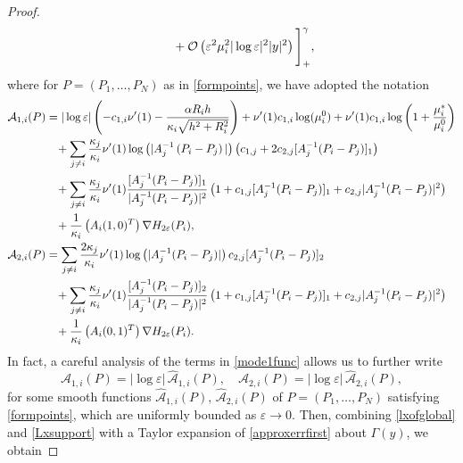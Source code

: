 \documentclass[11pt,reqno,a4paper]{amsart}
\numberwithin{equation}{section}
\newcommand{\ve}{\varepsilon}
\begin{document}
\begin{proof}
\begin{equation}
\begin{aligned}
&\hspace{10mm}+\mathcal{O}\left(\ve^2\mu_i^2|\log\ve|^2|y|^2\right)\Bigg]^{\gamma}_{+},
\end{aligned}
\end{equation}
where for $P=(P_1,\dots,P_N)$ as in \eqref{formpoints}, we have adopted the notation
\begin{equation}\label{mode1func}
\begin{aligned}
\mathcal{A}_{1,i}(P)&=|\log\ve|\left(-c_{1,i}\nu'(1)-\frac{\alpha R_i h}{\kappa_i\sqrt{h^2+R_i^2}}\right)+\nu'(1)c_{1,i}\log(\mu_{i}^{0})+\nu'(1)c_{1,i}\log\left(1+\frac{\mu^*_{i}}{\mu^{0}_{i}}\right)\\
&\hspace{3mm}+\sum_{j\neq i}\frac{\kappa_j}{\kappa_{i}}\nu'(1)\log\left(|A_j^{-1}\left(P_i-P_j\right)|\right)\left(c_{1,j}+2c_{2,j}[A_j^{-1}(P_i-P_j)]_1\right)\\
&\hspace{3mm}+\sum_{j\neq i}\frac{\kappa_j}{\kappa_i}\nu'(1)\frac{[A_j^{-1}(P_i-P_j)]_1}{|A_j^{-1}(P_i-P_j)|^2}\left(1+c_{1,j}[A_j^{-1}(P_i-P_j)]_1+c_{2,j}|A_{j}^{-1}(P_i-P_j)|^2\right)\\
&\hspace{3mm}+\frac{1}{\kappa_i}\left(A_{i}(1,0)^{T}\right)\nabla H_{2\ve}(P_i),\\
\mathcal{A}_{2,i}(P)&=\sum_{j \neq i}\frac{2\kappa_j}{\kappa_i}\nu'(1)\log\left(|A_j^{-1}(P_i-P_j)|\right)c_{2,j}[A_j^{-1}(P_i-P_j)]_{2}\\
&\hspace{3mm}+\sum_{j \neq i}\frac{\kappa_j}{\kappa_i}\nu'(1)\frac{[A_j^{-1}(P_i-P_j)]_{2}}{|A_j^{-1}(P_i-P_j)|^2}\left(1+c_{1,j}[A_j^{-1}(P_i-P_j)]_{1}+c_{2,j}|A_j^{-1}(P_i-P_j)|^2\right)\\
&\hspace{3mm}+\frac{1}{\kappa_i}\left(A_i(0,1)^{T}\right)\nabla H_{2\ve}(P_i).
\end{aligned}
\end{equation}
In fact, a careful analysis of the terms in \eqref{mode1func} allows us to further write 
\begin{equation}\label{logmode1fun}
    \mathcal{A}_{1,i}(P)=|\log\ve|\,\widehat{\mathcal{A}}_{1,i}(P), \quad 
\mathcal{A}_{2,i}(P)=|\log\ve|\,\widehat{\mathcal{A}}_{2,i}(P),
\end{equation}
for some smooth functions $\widehat{\mathcal{A}}_{1,i}(P),\,\widehat{\mathcal{A}}_{2,i}(P)$ of
$P=(P_1,\dots,P_N)$ satisfying \eqref{formpoints}, which are uniformly bounded as $\ve\to 0$. Then, combining  \eqref{lxofglobal} and \eqref{Lxsupport} with a Taylor expansion of \eqref{approxerrfirst} about $\Gamma(y)$, we obtain

\end{proof}
\end{document}
